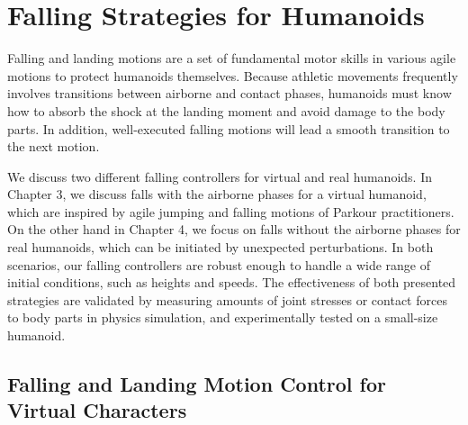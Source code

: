 \section{Falling Strategies for Humanoids}
Falling and landing motions are a set of fundamental motor skills
in various agile motions to protect humanoids themselves.
Because athletic movements frequently involves
transitions between airborne and contact phases, humanoids must know
how to absorb the shock at the landing moment and avoid damage to the body
parts. 
In addition, well-executed falling motions will lead a smooth transition to the
next motion.

We discuss two different falling controllers for virtual and real
humanoids. 
In Chapter 3, we discuss falls with the airborne phases for a virtual
humanoid, which are inspired by agile jumping and falling motions of Parkour
practitioners. 
On the other hand in Chapter 4, we focus on falls without the airborne
phases for real humanoids, which can be initiated by unexpected perturbations.
In both scenarios, our falling controllers are robust enough to handle a wide
range of initial conditions, such as heights and speeds.
The effectiveness of both presented strategies are validated by measuring
amounts of joint stresses or contact forces to body parts in physics
simulation, and experimentally tested on a small-size humanoid.

\subsection{Falling and Landing Motion Control for Virtual Characters}

